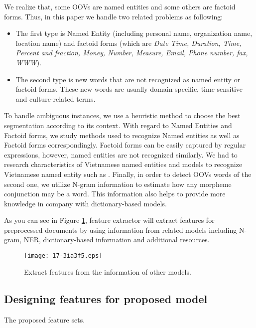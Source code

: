 \documentclass[english]{jnlp_1.4}
\begin{document}
We realize that, some OOVs are named entities and some others are factoid
forms. Thus, in this paper we handle two related problems as following:
\begin{itemize}
  \item The first type is Named Entity (including personal name,
organization name, location name) and factoid forms (which are \emph{Date Time, Duration, Time, Percent and fraction,
Money, Number, Measure, Email, Phone number, fax, WWW}).
  \item The second type is new words that are not recognized as named entity or factoid forms.
These new words are usually domain-specific, time-sensitive and culture-related terms.
\end{itemize}

   To handle ambiguous instances, we use a heuristic method to choose the best
segmentation according to its context. With regard to Named Entities and Factoid forms,
we study methods used to recognize Named entities as well as
Factoid forms correspondingly. Factoid forms can be easily captured by regular expressions,
however, named entities are not recognized similarly. We had to research characteristics of Vietnamese
named entities and models to recognize Vietnamese named entity such as \cite{CamTu05} \cite{Tri07}.
Finally, in order to detect OOVs words of the second one, we utilize N-gram information
to estimate how any morpheme conjunction may be a word.
This information also helps to provide more knowledge in company with dictionary-based models.

As you can see in Figure \ref{f2}, feature extractor will
extract features for preprocessed documents by using information from related models including
N-gram, NER, dictionary-based information and additional resources.

\begin{figure}[b]
\begin{center}
\texttt{[image: 17-3ia3f5.eps]}
\caption{Extract features from the information of other models.}
\label{f2}
\end{center}
\end{figure}


\subsection{Designing features for proposed model}

\begin{table}[b]
\caption{The proposed feature sets.}
\label{Feature Set}

\end{table}
\end{document}
